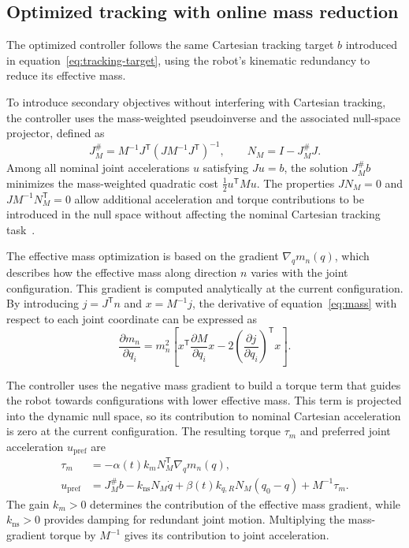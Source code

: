 \documentclass[11pt,a4paper]{article}
\newcommand{\Jm}{J_M^{\#}}
\begin{document}
\subsection{Optimized tracking with online mass reduction}

The optimized controller follows the same Cartesian tracking target $b$
introduced in equation~\eqref{eq:tracking-target}, using the robot's
kinematic redundancy to reduce its effective mass.

To introduce secondary objectives without interfering with Cartesian
tracking, the controller uses the mass-weighted pseudoinverse and the
associated null-space projector, defined as
\begin{equation}
 \Jm=M^{-1}J^{\mathsf T}(JM^{-1}J^{\mathsf T})^{-1},
 \qquad N_M=I-\Jm J .
 \label{eq:weighted-inverse}
\end{equation}
Among all nominal joint accelerations $u$ satisfying $Ju=b$, the solution
$\Jm b$ minimizes the mass-weighted quadratic cost
$\tfrac12u^{\mathsf T}Mu$. The properties $JN_M=0$ and
$JM^{-1}N_M^{\mathsf T}=0$ allow additional acceleration and torque
contributions to be introduced in the null space without affecting
the nominal Cartesian tracking task~\cite{khatib1987}.

The effective mass optimization is based on the gradient
$\nabla_q m_n(q)$, which describes how the effective mass along
direction $n$ varies with the joint configuration. This gradient is
computed analytically at the current configuration. By introducing
$j=J^{\mathsf T}n$ and $x=M^{-1}j$, the derivative of
equation~\eqref{eq:mass} with respect to each joint coordinate can
be expressed as
\begin{equation}
 \frac{\partial m_n}{\partial q_i}
 =m_n^2\left[
 x^{\mathsf T}\frac{\partial M}{\partial q_i}x
 -2\left(\frac{\partial j}{\partial q_i}\right)^{\mathsf T}x
 \right].
 \label{eq:mass-gradient}
\end{equation}

The controller uses the negative mass gradient to build a torque term
that guides the robot towards configurations with lower effective mass.
This term is projected into the dynamic null space, so its contribution
to nominal Cartesian acceleration is zero at the current configuration.
The resulting torque $\tau_m$ and preferred joint acceleration
$u_{\mathrm{pref}}$ are
\begin{equation}
 \boxed{\begin{aligned}
 \tau_m&=-\alpha(t)k_m N_M^{\mathsf T}\nabla_qm_n(q),\\
 u_{\mathrm{pref}}&=\Jm b-k_{\mathrm{ns}}N_M\dot q
       +\beta(t)k_{q,R}N_M(q_0-q)+M^{-1}\tau_m .
 \end{aligned}}
 \label{eq:preference}
\end{equation}
The gain $k_m>0$ determines the contribution of the effective mass
gradient, while $k_{\mathrm{ns}}>0$ provides damping for redundant
joint motion. Multiplying the mass-gradient torque by $M^{-1}$ gives
its contribution to joint acceleration.
\end{document}
